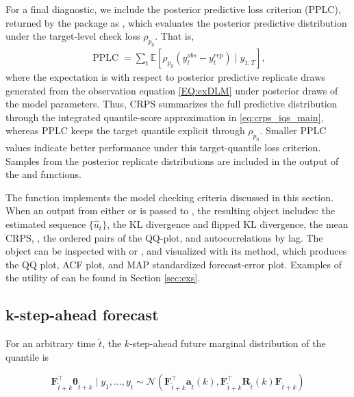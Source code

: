 \documentclass{jss}
\newcommand{\vect}[1]{\boldsymbol{#1}}
\newcommand{\mat}[1]{\mathbf{#1}}
\newcommand{\N}{\mathcal{N}}
\newcommand{\PPLC}{\operatorname{PPLC}}
\renewcommand{\E}{\mathbb{E}}
\begin{document}
For a final diagnostic, we include the \cite{gelfand1998model} posterior predictive loss criterion (PPLC), returned by the package as , which evaluates the posterior predictive distribution under the target-level check loss $\rho_{p_0}$. That is,
\begin{align}
\PPLC = \sum_t \E[\rho_{p_0} (y_t^{obs}-y^{rep}_t) \mid y_{1:T}],
\label{eq:pplc_main}
\end{align}
where the expectation is with respect to posterior predictive replicate draws generated from the observation equation \eqref{EQ:exDLM} under posterior draws of the model parameters. Thus, CRPS summarizes the full predictive distribution through the integrated quantile-score approximation in \eqref{eq:crps_iqs_main}, whereas PPLC keeps the target quantile explicit through $\rho_{p_0}$. Smaller PPLC values indicate better performance under this target-quantile loss criterion. Samples from the posterior replicate distributions are included in the output of the  and  functions.

The function  implements the model checking criteria discussed in this section. When an output from either  or  is passed to , the resulting  object includes: the estimated sequence $\{\hat u_t\}$, the KL divergence and flipped KL divergence, the mean CRPS, , the ordered pairs of the QQ-plot, and autocorrelations by lag. The object can be inspected with  or , and visualized with its  method, which produces the QQ plot, ACF plot, and MAP standardized forecast-error plot. Examples of the utility of  can be found in Section \ref{sec:exs}.

\subsection{k-step-ahead forecast}

For an arbitrary time $\tilde{t}$, the $k$-step-ahead future marginal distribution of the quantile is

\begin{equation}
\mat{F}_{\tilde{t}+k}^\top \vect{\theta}_{\tilde{t}+k}\mid y_1,\dots,y_{\tilde{t}} \sim \N(\mat{F}_{\tilde{t}+k}^\top \mat{a}_{\tilde{t}}(k),\mat{F}_{\tilde{t}+k}^\top\mat{R}_{\tilde{t}}(k)\mat{F}_{\tilde{t}+k})
\label{eq:forecast_recursion}
\end{equation}
\end{document}
